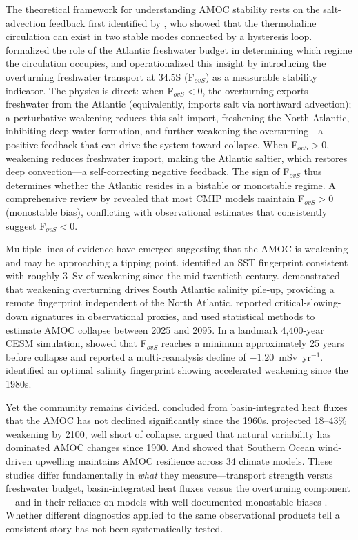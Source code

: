 \documentclass{agujournal2019}
\begin{document}
The theoretical framework for understanding AMOC stability rests on the salt-advection feedback first identified by , who showed that the thermohaline circulation can exist in two stable modes connected by a hysteresis loop.  formalized the role of the Atlantic freshwater budget in determining which regime the circulation occupies, and  operationalized this insight by introducing the overturning freshwater transport at 34.5\textdegree S (F$_{ovS}$) as a measurable stability indicator. The physics is direct: when F$_{ovS} < 0$, the overturning exports freshwater from the Atlantic (equivalently, imports salt via northward advection); a perturbative weakening reduces this salt import, freshening the North Atlantic, inhibiting deep water formation, and further weakening the overturning---a positive feedback that can drive the system toward collapse. When F$_{ovS} > 0$, weakening reduces freshwater import, making the Atlantic saltier, which restores deep convection---a self-correcting negative feedback. The sign of F$_{ovS}$ thus determines whether the Atlantic resides in a bistable or monostable regime. A comprehensive review by  revealed that most CMIP models maintain F$_{ovS} > 0$ (monostable bias), conflicting with observational estimates that consistently suggest F$_{ovS} < 0$.

Multiple lines of evidence have emerged suggesting that the AMOC is weakening and may be approaching a tipping point.  identified an SST fingerprint consistent with roughly 3~Sv of weakening since the mid-twentieth century.  demonstrated that weakening overturning drives South Atlantic salinity pile-up, providing a remote fingerprint independent of the North Atlantic.  reported critical-slowing-down signatures in observational proxies, and  used statistical methods to estimate AMOC collapse between 2025 and 2095. In a landmark 4,400-year CESM simulation,  showed that F$_{ovS}$ reaches a minimum approximately 25 years before collapse and reported a multi-reanalysis decline of $-1.20$~mSv~yr$^{-1}$.  identified an optimal salinity fingerprint showing accelerated weakening since the 1980s.

Yet the community remains divided.  concluded from basin-integrated heat fluxes that the AMOC has not declined significantly since the 1960s.  projected 18--43\% weakening by 2100, well short of collapse.  argued that natural variability has dominated AMOC changes since 1900. And  showed that Southern Ocean wind-driven upwelling maintains AMOC resilience across 34 climate models. These studies differ fundamentally in \emph{what} they measure---transport strength versus freshwater budget, basin-integrated heat fluxes versus the overturning component---and in their reliance on models with well-documented monostable biases \cite{Weijer2019,vanWestenDijkstra2024}. Whether different diagnostics applied to the same observational products tell a consistent story has not been systematically tested.
\end{document}
